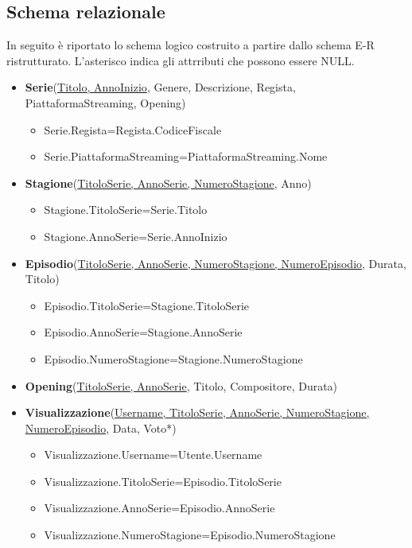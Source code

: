\documentclass[12pt,a4paper]{article}
\begin{document}
\subsection{Schema relazionale}
In seguito è riportato lo schema logico costruito a partire dallo schema E-R ristrutturato.
L'asterisco indica gli attrributi che possono essere NULL.
\begin{itemize}
    \item \textbf{Serie}(\underline{Titolo, AnnoInizio}, Genere, Descrizione, Regista, PiattaformaStreaming, Opening)
    \begin{itemize}
        \item Serie.Regista=Regista.CodiceFiscale
        \item Serie.PiattaformaStreaming=PiattaformaStreaming.Nome
    \end{itemize}
    \item \textbf{Stagione}(\underline{TitoloSerie, AnnoSerie, NumeroStagione}, Anno)
    \begin{itemize}
        \item Stagione.TitoloSerie=Serie.Titolo
        \item Stagione.AnnoSerie=Serie.AnnoInizio
    \end{itemize}
    \item \textbf{Episodio}(\underline{TitoloSerie, AnnoSerie, NumeroStagione, NumeroEpisodio}, Durata, Titolo)
    \begin{itemize}
        \item Episodio.TitoloSerie=Stagione.TitoloSerie
        \item Episodio.AnnoSerie=Stagione.AnnoSerie
        \item Episodio.NumeroStagione=Stagione.NumeroStagione
    \end{itemize}
    \item \textbf{Opening}(\underline{TitoloSerie, AnnoSerie}, Titolo, Compositore, Durata)
    \item \textbf{Visualizzazione}(\underline{Username, TitoloSerie, AnnoSerie, NumeroStagione, NumeroEpisodio}, Data, Voto*) 
    \begin{itemize}
        \item Visualizzazione.Username=Utente.Username
        \item Visualizzazione.TitoloSerie=Episodio.TitoloSerie
        \item Visualizzazione.AnnoSerie=Episodio.AnnoSerie
        \item Visualizzazione.NumeroStagione=Episodio.NumeroStagione

\end{itemize}
\end{itemize}
\end{document}
